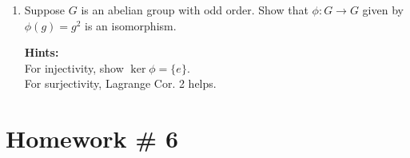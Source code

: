 \begin{enumerate}
\begin{enumerate}
    \end{enumerate} 

    \item Suppose \( G \) is an abelian group with odd order. Show that \( \phi: G \to G \) given by \( \phi(g) = g^2 \) is an isomorphism.

    \textbf{Hints:} \\
    For injectivity, show \( \ker \phi = \{e\} \). \\
    For surjectivity, Lagrange Cor. 2 helps.
\end{enumerate}
\newpage

\section*{Homework \# 6}
\label{sec:HW6}
